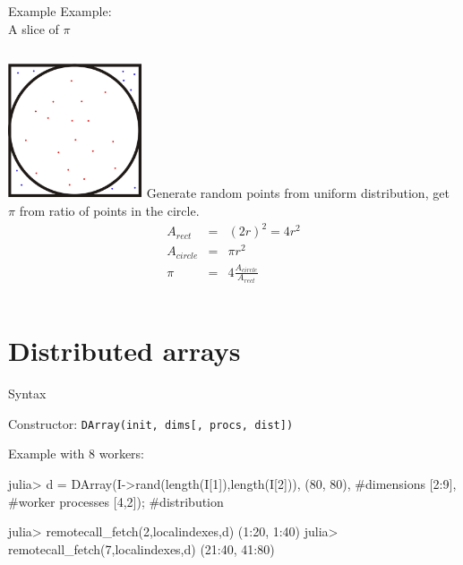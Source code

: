 \documentclass{beamer}
\begin{document}
	\begin{frame}{Example}
		Example: \\
		A slice of  $\pi$
		\begin{columns}[c]
			\includegraphics[height=4cm]{figures/square_circle.jpg}
			Generate random points from uniform distribution, get $\pi$ from ratio of points in the circle.
			\begin{equation*}
				\begin{array}{rcl}		
					A_{rect} & = & (2r)^2 = 4r^2 \\
					A_{circle} & = & \pi r^2 \\
					\pi & = & 4\frac{A_{circle}}{A_{rect}}
				\end{array}
			\end{equation*}
		\end{columns}
	\end{frame}

	\section{Distributed arrays}
	\begin{frame}[fragile]{Syntax}
    \begin{block}{Constructor:}
		\verb+DArray(init, dims[, procs, dist])+
		\end{block}
		\begin{block}{Example with 8 workers:}
		\begin{semiverbatim}
		julia> d = DArray(I->rand(length(I[1]),length(I[2])),
											(80, 80),  #dimensions
											[2:9],     #worker processes
											[4,2]);	   #distribution
		
		julia> remotecall\_fetch(2,localindexes,d)
		(1:20, 1:40)
		julia> remotecall\_fetch(7,localindexes,d)
		(21:40, 41:80)
		\end{semiverbatim}
		\end{block}
	\end{frame}
\end{document}
